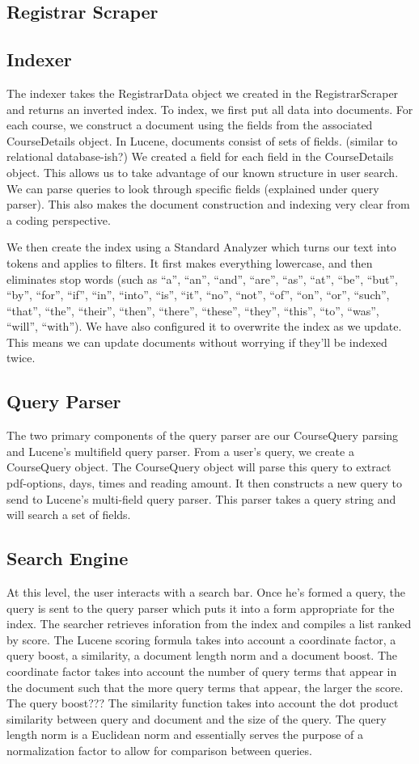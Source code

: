 \documentclass[12pt,letterpaper]{article}
\begin{document}
	\subsection{Registrar Scraper}
	\subsection{Indexer}
	The indexer takes the RegistrarData object we created in the RegistrarScraper and returns an inverted index. To index, we first put all data into documents. For each course, we construct a document using the fields from the associated CourseDetails object. In Lucene, documents consist of sets of fields. (similar to relational database-ish?) We created a field for each field in the CourseDetails object. This allows us to take advantage of our known structure in user search. We can parse queries to look through specific fields (explained under query parser). This also makes the document construction and indexing very clear from a coding perspective. 
	
	We then create the index using a Standard Analyzer which turns our text into tokens and applies to filters. It first makes everything lowercase, and then eliminates stop words (such as ``a'', ``an'',  ``and'', ``are'', ``as'', ``at'', ``be'', ``but'', ``by'', ``for'', ``if'', ``in'', ``into'', ``is'', ``it'', ``no'', ``not'', ``of'', ``on'', ``or'', ``such'', ``that'', ``the'', ``their'', ``then'', ``there'', ``these'', ``they'', ``this'', ``to'', ``was'', ``will'', ``with''). We have also configured it to overwrite the index as we update. This means we can update documents without worrying if they'll be indexed twice. 
	\subsection{Query Parser}
	The two primary components of the query parser are our CourseQuery parsing and Lucene's multifield query parser. From a user's query, we create a CourseQuery object. The CourseQuery object will parse this query to extract pdf-options, days, times and reading amount. It then constructs a new query to send to Lucene's multi-field query parser. This parser takes a query string and will search a set of fields.
	\subsection{Search Engine}
		At this level, the user interacts with a search bar. Once he's formed a query, the query is sent to the query parser which puts it into a form appropriate for the index. The searcher retrieves inforation from the index and compiles a list ranked by score. The Lucene scoring formula takes into account a coordinate factor, a query boost, a similarity, a document length norm and a document boost. 
		The coordinate factor takes into account the number of query terms that appear in the document such that the more query terms that appear, the larger the score. 
		The query boost???
		The similarity function takes into account the dot product similarity between query and document and the size of the query. The query length norm is a Euclidean norm and essentially serves the purpose of a normalization factor to allow for comparison between queries.
				
\end{document}
